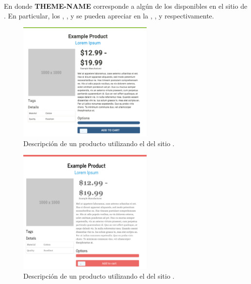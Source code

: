 En donde \textbf{THEME-NAME} corresponde a algún \themeCPT de los disponibles en el sitio de \bootswatchNAME. En particular, los \themesCPT \textbf{\themeSandstone}, \textbf{\themeJournal}, \textbf{\themeCyborg} y \textbf{\themeSuperHero} se pueden apreciar en la , ,  y  respectivamente.


\begin{figure}[H]
	\centering
	\includegraphics[width=0.6\textwidth]{figuras/bootstrap/bootstrap_theme_sandstone.png}

	\caption{Descripción de un producto utilizando el \themeCPT \textbf{\themeSandstone} del sitio \bootswatchNAME.}
	\label{figure:bootstrap:theme_standstone}
\end{figure}

\begin{figure}[H]
	\centering
	\includegraphics[width=0.6\textwidth]{figuras/bootstrap/bootstrap_theme_journal.png}

	\caption{Descripción de un producto utilizando el \themeCPT \textbf{\themeJournal} del sitio \bootswatchNAME.}
	\label{figure:bootstrap:theme_journal}
\end{figure}

